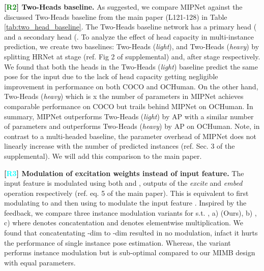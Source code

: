 \documentclass[10pt,twocolumn,letterpaper]{article}
\newcommand{\Rtwo}{\textcolor{green}{R2}}
\newcommand{\Rthree}{\textcolor{cyan}{R3}}
\begin{document}
\vspace{1.5mm}\noindent
\textbf{[\Rtwo] Two-Heads baseline.} As suggested, we compare MIPNet against the discussed Two-Heads baseline from the main paper (L121-128) in Table \ref{tab:two_head_baseline}. The Two-Heads baseline network has a primary head ( and a secondary head (. To analyze the effect of head capacity in multi-instance prediction, we create two baselines: Two-Heads (\textit{light}), and Two-Heads (\textit{heavy}) by splitting HRNet at stage  (ref. Fig 2 of supplemental) and, after stage  respectively. We found that both the heads in the Two-Heads (\textit{light}) baseline predict the same pose for the input due to the lack of head capacity getting negligible improvement in performance on both COCO and OCHuman. On the other hand, Two-Heads (\textit{heavy}) which is x the number of parameters in MIPNet achieves comparable performance on COCO but trails behind MIPNet on OCHuman. In summary, MIPNet outperforms Two-Heads (\textit{light}) by  AP with a similar number of parameters and outperforms Two-Heads (\textit{heavy}) by  AP on OCHuman. Note, in contrast to a multi-headed baseline, the parameter overhead of MIPNet does not linearly increase with the number of predicted instances  (ref. Sec. 3 of the supplemental). We will add this comparison to the main paper.


\vspace{1.5mm}\noindent
\textbf{[\Rthree] Modulation of excitation weights instead of input feature.} The input feature  is modulated using both  and , outputs of the \textit{excite} and \textit{embed} operation respectively (ref. eq. 5 of the main paper). This is equivalent to first  modulating  to  and then using  to modulate the input feature . Inspired by the feedback, we compare three instance modulation variants for   s.t. , a)  (Ours), b) , c)  where  denotes concatentation and  denotes elementwise multiplication. We found that concatentating -dim  to -dim  resulted in no modulation, infact it hurts the performance of single instance pose estimation. Whereas, the variant  performs instance modulation  but is sub-optimal compared to our MIMB design with equal parameters.
\end{document}
